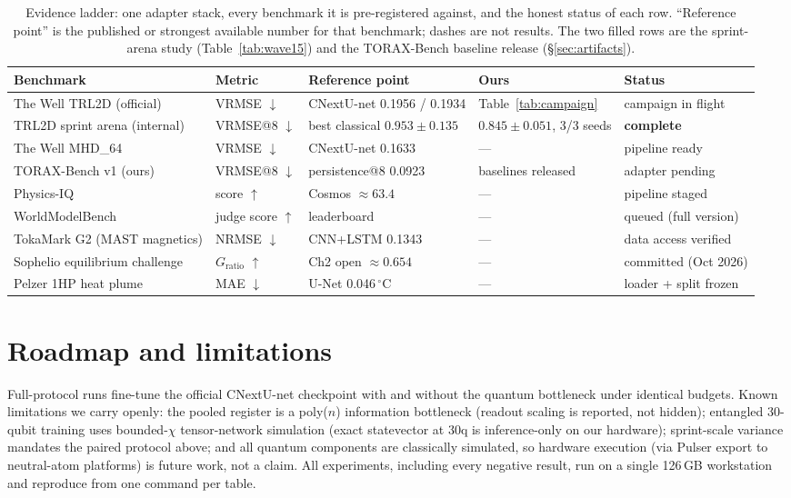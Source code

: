 \documentclass{article}
\newcommand{\TRLanchorRepro}{0.1934}  %
\newcommand{\TRLanchorPub}{0.1956}    %
\begin{document}
\begin{table}[h]
\centering
\scriptsize
\setlength{\tabcolsep}{3pt}
\begin{tabular}{lllll}
\toprule
Benchmark & Metric & Reference point & Ours & Status \\
\midrule
The Well TRL2D (official) & VRMSE $\downarrow$ & CNextU-net \TRLanchorPub{} / \TRLanchorRepro & Table~\ref{tab:campaign} & campaign in flight \\
TRL2D sprint arena (internal) & VRMSE@8 $\downarrow$ & best classical $0.953 \pm 0.135$ & $\mathbf{0.845 \pm 0.051}$, 3/3 seeds & \textbf{complete} \\
The Well MHD\_64 & VRMSE $\downarrow$ & CNextU-net 0.1633 & --- & pipeline ready \\
TORAX-Bench v1 (ours) & VRMSE@8 $\downarrow$ & persistence@8 0.0923 & baselines released & adapter pending \\
Physics-IQ & score $\uparrow$ & Cosmos $\approx 63.4$ & --- & pipeline staged \\
WorldModelBench & judge score $\uparrow$ & leaderboard & --- & queued (full version) \\
TokaMark G2 (MAST magnetics) & NRMSE $\downarrow$ & CNN+LSTM 0.1343 & --- & data access verified \\
Sophelio equilibrium challenge & $G_{\mathrm{ratio}}$ $\uparrow$ & Ch2 open $\approx 0.654$ & --- & committed (Oct 2026) \\
Pelzer 1HP heat plume & MAE $\downarrow$ & U-Net 0.046\,$^{\circ}$C & --- & loader + split frozen \\
\bottomrule
\end{tabular}
\vspace{2pt}
\caption{Evidence ladder: one adapter stack, every benchmark it is
pre-registered against, and the honest status of each row. ``Reference
point'' is the published or strongest available number for that benchmark;
dashes are not results. The two filled rows are the sprint-arena study
(Table~\ref{tab:wave15}) and the TORAX-Bench baseline release
(\S\ref{sec:artifacts}).}
\label{tab:ladder}
\end{table}

\section{Roadmap and limitations}
\label{sec:roadmap}

Full-protocol runs fine-tune the official CNextU-net checkpoint with and
without the quantum bottleneck under identical budgets. Known limitations we
carry openly: the pooled register is a poly($n$) information bottleneck
(readout scaling is reported, not hidden); entangled 30-qubit training uses
bounded-$\chi$ tensor-network simulation (exact statevector at 30q is
inference-only on our hardware); sprint-scale variance mandates the paired
protocol above; and all quantum components are classically simulated, so
hardware execution (via Pulser export to neutral-atom platforms) is future
work, not a claim. All experiments, including every negative result, run on a
single 126\,GB workstation and reproduce from one command per table.



\end{document}
